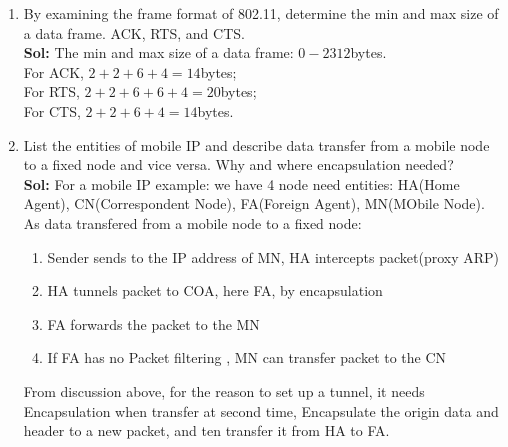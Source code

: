 \documentclass[11pt]{article}
\begin{document}
\begin{enumerate}
\item By examining the frame format of 802.11, determine the min and max size of a data frame. ACK, RTS, and CTS.\\%
\textbf{Sol:}
The min and max size of a data frame: $0-2312$bytes. \\
For ACK, $2+2+6+4=14$bytes;\\
For RTS, $2+2+6+6+4=20$bytes;\\
For CTS, $2+2+6+4=14$bytes.

\item List the entities of mobile IP and describe data transfer from a mobile node to a fixed node and vice versa. Why and where encapsulation needed?\\
\textbf{Sol:} For a mobile IP example: we have 4 node need entities: HA(Home Agent), CN(Correspondent Node), FA(Foreign Agent), MN(MObile Node). As data transfered from a mobile node to a fixed node: 
\begin{enumerate}
\item Sender sends to the IP address of MN, HA intercepts packet(proxy ARP)
\item HA tunnels packet to COA, here FA, by encapsulation
\item FA forwards the packet to the MN
\item If FA has no Packet filtering , MN can transfer packet to the CN
\end{enumerate}
From discussion above, for the reason to set up a tunnel, it needs Encapsulation when transfer at second time, Encapsulate the origin data and header to a new packet, and ten transfer it from HA to FA.


\end{enumerate}
\end{document}
